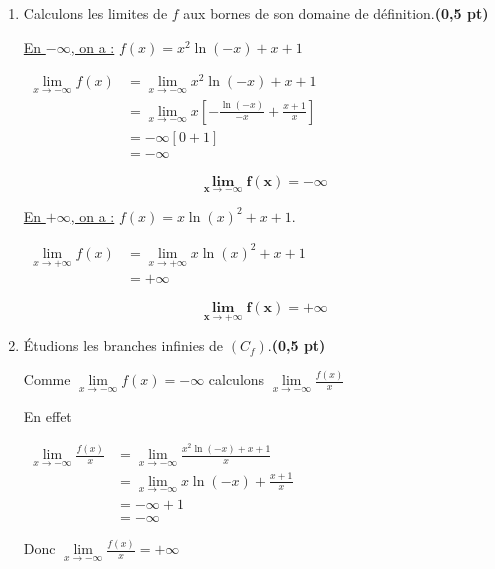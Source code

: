 \documentclass[12pt,a4paper]{article}
\begin{document}
\begin{enumerate}
\item Calculons les limites de \( f \) aux bornes de son domaine de définition.\hfill \textbf{(0,5 pt)}

\underline{En \( -\infty \), on a :} \( f(x) = x^2 \ln(-x) + x + 1 \)

\(
\begin{aligned}
    \lim\limits_{x\to -\infty} f(x) &= \lim\limits_{x\to -\infty} x^2 \ln(-x) + x + 1\\
    &= \lim\limits_{x\to -\infty} x \left[-\frac{\ln(-x)}{-x} + \frac{x + 1}{x}\right]\\
    &= -\infty \left[0+1 \right]\\
    &=-\infty
\end{aligned}
\)

\begin{resultbox}
    \[
        \mathbf{\lim\limits_{x\to -\infty} f(x) = -\infty }
    \]
\end{resultbox} 

\underline{En \( +\infty \), on a :} \( f(x) = x \ln(x)^2 + x + 1. \)

\(
\begin{aligned}
    \lim\limits_{x\to +\infty} f(x) &= \lim\limits_{x\to +\infty}  x \ln(x)^2 + x + 1\\
    &=+\infty
\end{aligned}
\)

\begin{resultbox}
    \[
        \mathbf{\lim\limits_{x\to +\infty} f(x) = +\infty }
    \]
\end{resultbox} 

\item Étudions les branches infinies de \( (C_f) \).\hfill \textbf{(0,5 pt)}

Comme \( \lim\limits_{x\to -\infty} f(x) = -\infty  \) calculons \( \lim\limits_{x\to -\infty} \frac{f(x)}{x}   \)

En effet 

\( 
\begin{aligned}
    \lim\limits_{x\to -\infty} \frac{f(x)}{x} &= \lim\limits_{x\to -\infty} \frac{x^2 \ln(-x) + x + 1}{x}\\
    &=\lim\limits_{x\to -\infty} x\ln(-x) + \frac{x + 1}{x}\\
    &=-\infty+1\\
    &=-\infty
\end{aligned} 
\)

Donc \( \lim\limits_{x\to -\infty} \frac{f(x)}{x} =+\infty   \)


\end{enumerate}
\end{document}
